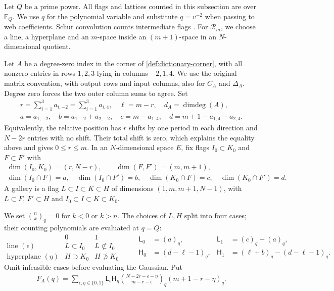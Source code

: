 \documentclass[a4paper,11pt]{amsart}
\numberwithin{equation}{subsection}
\theoremstyle{plain}
\theoremstyle{definition}
\theoremstyle{remark}
\newcommand{\gbinom}[2]{\binom{#1}{#2}}
\begin{document}
Let $Q$ be a prime power. All flags and lattices counted in this
subsection are over $\mathbb F_Q$. We use $q$ for the polynomial
variable and substitute $q=v^{-2}$ when passing to web coefficients.
Schur convolution counts intermediate flags \cite{BLM,LusztigAffine}.
For $\mathcal R_m$, we choose a line, a hyperplane and an
$m$-space inside an $(m+1)$-space in an $N$-dimensional quotient.

\begin{definition}\label{def:gallery-flags}
Let $A$ be a degree-zero index in the corner of
\autoref{def:dictionary-corner}, with all nonzero entries in rows
$1,2,3$ lying in columns $-2,1,4$. We use the original matrix
convention, with output rows and input columns, also for $C_A$
and $\Delta_A$. Degree zero forces the two outer column sums
to agree.
Set
\[
\begin{gathered}
r=\sum_{i=1}^3 a_{i,-2}=\sum_{i=1}^3 a_{i,4},\quad \ell=m-r,
\quad d_A=\operatorname{dimdeg}(A),\\
a=a_{1,-2},\quad b=a_{1,-2}+a_{2,-2},\quad
c=m-a_{1,4},\quad d=m+1-a_{1,4}-a_{2,4}.
\end{gathered}
\]
Equivalently, the relative position has $r$ shifts by one period
in each direction and $N-2r$ entries with no shift. Their total
shift is zero, which explains the equality above and gives
$0\le r\le m$.
In an $N$-dimensional space $E$, fix flags $I_0\subset K_0$
and $F\subset F'$ with
\[
\begin{gathered}
\dim(I_0,K_0)=(r,N-r),\qquad\dim(F,F')=(m,m+1),\\
\dim(I_0\cap F)=a,\quad\dim(I_0\cap F')=b,\quad
\dim(K_0\cap F)=c,\quad\dim(K_0\cap F')=d.
\end{gathered}
\]
A gallery is a flag $L\subset I\subset K\subset H$ of
dimensions $(1,m,m+1,N-1)$, with $L\subset F$, $F'\subset H$
and $I_0\subset I\subset K\subset K_0$.
\end{definition}


We set $\gbinom{n}{k}_q=0$ for $k<0$ or $k>n$.
The choices of $L,H$ split into four cases; their counting
polynomials are evaluated at $q=Q$:
\[
\begin{array}{c|cc}
&0&1\\\hline
\text{line }(\epsilon)&L\subset I_0&L\not\subset I_0\\
\text{hyperplane }(\eta)&H\supset K_0&H\not\supset K_0
\end{array}
\qquad
\begin{aligned}
\mathsf L_0&=(a)_q,&\mathsf L_1&=(c)_q-(a)_q,\\
\mathsf H_0&=(d-\ell-1)_q,&
\mathsf H_1&=(\ell+b)_q-(d-\ell-1)_q.
\end{aligned}
\]
Omit infeasible cases before evaluating the Gaussian. Put
\begin{gather}\label{eq:gallery-Gaussian}
F_A(q)=\sum_{\epsilon,\eta\in\{0,1\}}
\mathsf L_\epsilon\mathsf H_\eta
\gbinom{N-2r-\epsilon-\eta}{m-r-\epsilon}_{q}
(m+1-r-\eta)_q.
\end{gather}
\end{document}
